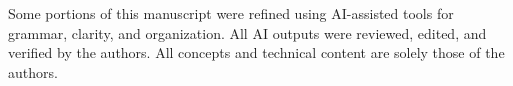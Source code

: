 \documentclass[conference]{IEEEtran}
\begin{document}
Some portions of this manuscript were refined using AI-assisted tools for grammar, clarity, and organization. All AI outputs were reviewed, edited, and verified by the authors. All concepts and technical content are solely those of the authors.








\nocite{*} %

%
%








\end{document}

